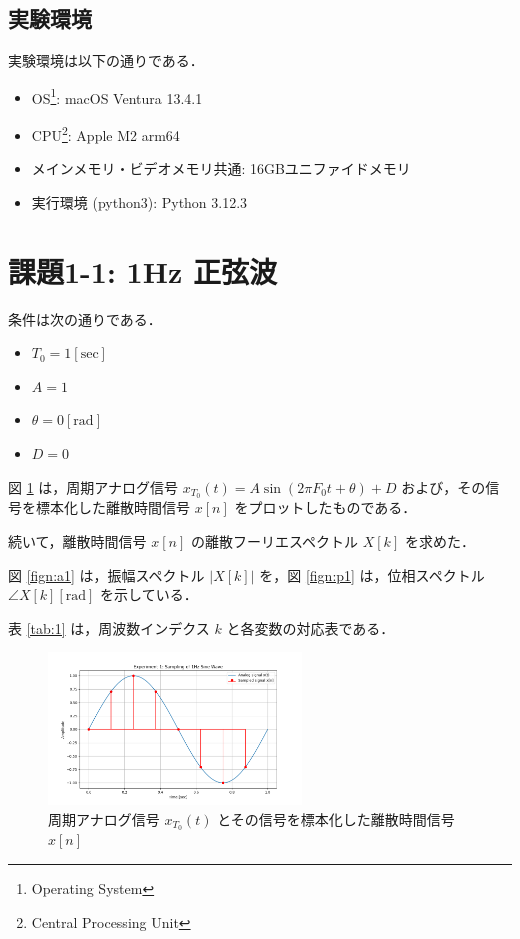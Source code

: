\documentclass[fleqn, a4paper. 12pt]{jsarticle}
\begin{document}
  \subsection*{実験環境}

    実験環境は以下の通りである．

    \begin{itemize}
      \item OS\footnote{Operating System}: macOS Ventura 13.4.1
      \item CPU\footnote{Central Processing Unit}: Apple M2 arm64\footnotemark[4]
      \item メインメモリ・ビデオメモリ共通: 16GBユニファイドメモリ\footnotemark[4]
      \item 実行環境 (python3): Python 3.12.3
    \end{itemize}

  \newpage
  \section*{課題1-1: 1Hz 正弦波}

    条件は次の通りである．

    \begin{itemize}
      \item $T_0 = 1 [\mathrm{sec}]$
      \item $A = 1$
      \item $\theta = 0 [\mathrm{rad}]$
      \item $D = 0$
    \end{itemize}

    図 \ref{fig:s1} は，周期アナログ信号 $x_{T_0}(t)=A \sin \left(2 \pi F_0 t+\theta\right)+D$ および，その信号を標本化した離散時間信号 $x[n]$ をプロットしたものである．
    
    続いて，離散時間信号 $x[n]$ の離散フーリエスペクトル $X[k]$ を求めた．
    
    図 \ref{fign:a1} は，振幅スペクトル $|X[k]|$ を，図 \ref{fign:p1} は，位相スペクトル $\angle X[k][\mathrm{rad}]$ を示している．

    表 \ref{tab:1} は，周波数インデクス $k$ と各変数の対応表である．

    \begin{figure}[!h]
      \centering
      \includegraphics[width=0.6\textwidth]{sampling_experiment_1.png}
      \caption{周期アナログ信号 $x_{T_0}(t)$ とその信号を標本化した離散時間信号 $x[n]$}
      \label{fig:s1}
    \end{figure}
\end{document}
